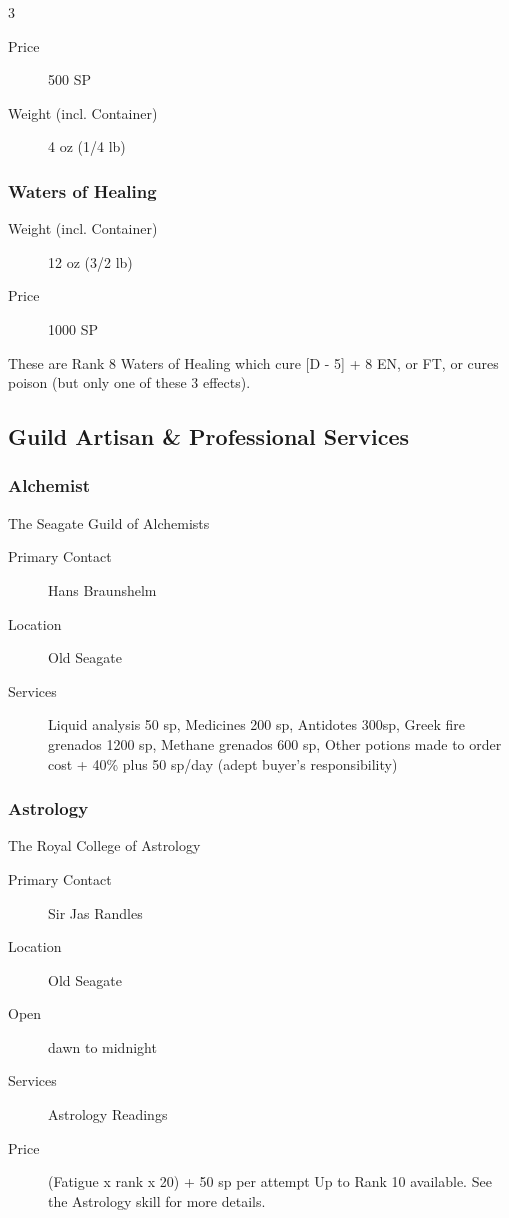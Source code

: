 \begin{multicols}{3}
\begin{description}
\item[Price] 500 SP
\item[Weight (incl. Container)] 4 oz (1/4 lb)
\end{description}

\subsubsection{Waters of Healing}

\begin{description}
\item[Weight (incl. Container)] 12 oz (3/2 lb)
\item[Price] 1000 SP
\end{description}

These are Rank 8 Waters of Healing which cure [D - 5] + 8 EN, or FT,
or cures poison (but only one of these 3 effects).

%
%

\subsection{Guild Artisan \& Professional Services}

\subsubsection{Alchemist}

The Seagate Guild of Alchemists

\begin{description}
\item[Primary Contact] Hans Braunshelm
\item[Location] Old Seagate
\item[Services] Liquid analysis 50 sp, Medicines 200 sp, Antidotes
  300sp, Greek fire grenados 1200 sp, Methane grenados 600 sp, Other
  potions made to order cost + 40\% plus 50 sp/day (adept buyer’s
  responsibility)
\end{description}

\subsubsection{Astrology}

The Royal College of Astrology

\begin{description}
\item[Primary Contact] Sir Jas Randles
\item[Location] Old Seagate
\item[Open] dawn to midnight
\item[Services] Astrology Readings
\item[Price] (Fatigue x rank x 20) + 50 sp per attempt Up to Rank 10
  available. See the Astrology skill for more details.
\end{description}


\end{multicols}
